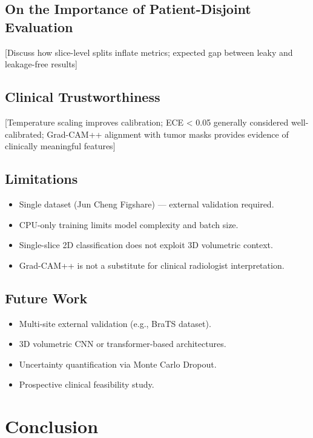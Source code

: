 \documentclass[journal]{IEEEtran}
\begin{document}
\subsection{On the Importance of Patient-Disjoint Evaluation}

[Discuss how slice-level splits inflate metrics; expected gap between leaky and leakage-free results]

\subsection{Clinical Trustworthiness}

[Temperature scaling improves calibration; ECE < 0.05 generally considered well-calibrated;
Grad-CAM++ alignment with tumor masks provides evidence of clinically meaningful features]

\subsection{Limitations}

\begin{itemize}
  \item Single dataset (Jun Cheng Figshare) — external validation required.
  \item CPU-only training limits model complexity and batch size.
  \item Single-slice 2D classification does not exploit 3D volumetric context.
  \item Grad-CAM++ is not a substitute for clinical radiologist interpretation.
\end{itemize}

\subsection{Future Work}

\begin{itemize}
  \item Multi-site external validation (e.g., BraTS dataset).
  \item 3D volumetric CNN or transformer-based architectures.
  \item Uncertainty quantification via Monte Carlo Dropout.
  \item Prospective clinical feasibility study.
\end{itemize}

\section{Conclusion}
\label{sec:conclusion}
\end{document}
